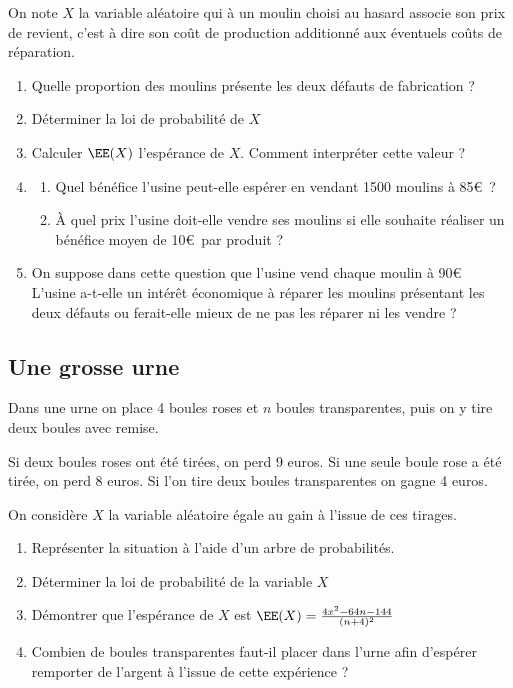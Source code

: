 \documentclass[oneside,12pt]{book}          %
\begin{document}
On note $X$ la variable aléatoire qui à un moulin choisi au hasard associe son prix de revient, c'est à dire son coût de production additionné aux éventuels coûts de réparation.
\begin{enumerate}
    \item Quelle proportion des moulins présente les deux défauts de fabrication ?
    \item Déterminer la loi de probabilité de $X$
    \item Calculer $\EE(X)$ l'espérance de $X$. Comment interpréter cette valeur ?
    \item \begin{enumerate}
        \item Quel bénéfice l'usine peut-elle espérer en vendant 1500 moulins à 85\euro\, ?
        \item À quel prix l'usine doit-elle vendre ses moulins si elle souhaite réaliser un bénéfice moyen de 10\euro\, par produit ?
    \end{enumerate}
    \item On suppose dans cette question que l'usine vend chaque moulin à 90\euro\\
    L'usine a-t-elle un intérêt économique à réparer les moulins présentant les deux défauts ou ferait-elle mieux de ne pas les réparer ni les vendre ?
\end{enumerate}



\subsection{Une grosse urne}
Dans une urne on place 4 boules roses et $n$ boules transparentes, puis on y tire deux boules avec remise.

Si deux boules roses ont été tirées, on perd 9 euros. Si une seule boule rose a été tirée, on perd 8 euros. Si l'on tire deux boules transparentes on gagne 4 euros.

On considère $X$ la variable aléatoire égale au gain à l'issue de ces tirages.
\begin{enumerate}
    \item Représenter la situation à l'aide d'un arbre de probabilités.
    \item Déterminer la loi de probabilité de la variable $X$
    \item Démontrer que l'espérance de $X$ est $\EE(X)=\frac{4x^2-64n-144}{(n+4)^2}$
    \item Combien de boules transparentes faut-il placer dans l'urne afin d'espérer remporter de l'argent à l'issue de cette expérience ?
\end{enumerate}
\end{document}

